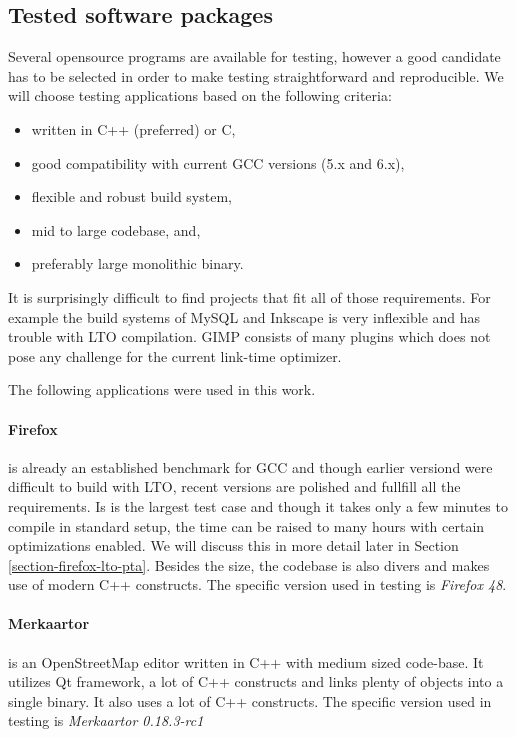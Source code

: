 \subsection{Tested software packages}

Several opensource programs are available for testing, however a good candidate has
to be selected in order to make testing straightforward and reproducible.
We will choose testing applications based on the following criteria:

\begin{itemize}
	\item written in C++ (preferred) or C,
	\item good compatibility with current GCC versions (5.x and 6.x),
	\item flexible and robust build system,
	\item mid to large codebase, and,
	\item preferably large monolithic binary.
\end{itemize}

It is surprisingly difficult to find projects that fit all of those
requirements. For example the build systems of MySQL and Inkscape is very
inflexible and has trouble with LTO compilation. GIMP consists of many plugins
which does not pose any challenge for the current link-time optimizer. 

The following applications were used in this work.

\paragraph{Firefox} is already an established benchmark for GCC \cite{glek2010}
and though earlier versiond were difficult to build with LTO, recent versions
are polished and fullfill all the requirements. Is is the largest test case and
though it takes only a few minutes to compile in standard setup, the time can be
raised to many hours with certain optimizations enabled. We will discuss this in
more detail later in Section \ref{section-firefox-lto-pta}. Besides the size,
the codebase is also divers and makes use of modern C++ constructs. The specific
version used in testing is {\it Firefox 48}.

\paragraph{Merkaartor} is an OpenStreetMap editor written in C++ with medium
sized code-base. It utilizes Qt framework, a lot of C++ constructs and links
plenty of objects into a single binary. It also uses a lot of C++ constructs.  The
specific version used in testing is {\it Merkaartor 0.18.3-rc1}


